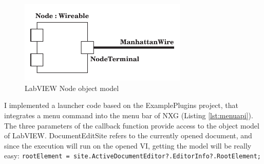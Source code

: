 \begin{figure}

\centering
\includegraphics[width=80mm,keepaspectratio]{figures/lvobject.pdf}
\caption{LabVIEW Node object model} 
\label{fig:lvobject}
\end{figure}
I implemented a launcher code based on the ExamplePlugins project, that integrates a menu command into the menu bar of NXG (Listing \ref{lst:menuapi}). The three parameters of the callback function provide access to the object model of LabVIEW. DocumentEditSite refers to the currently opened document, and since the execution will run on the opened VI, getting the model will be really easy: \lstinline[columns=fixed]{rootElement = site.ActiveDocumentEditor?.EditorInfo?.RootElement;}

